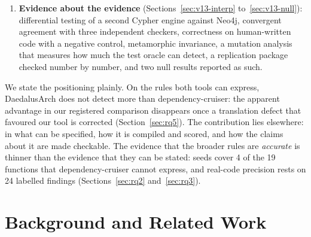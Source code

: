 \documentclass[10pt,a4paper]{article}
\newcommand{\tool}{DaedalusArch}
\newcommand{\dc}{dependency-cruiser}
\begin{document}
\begin{enumerate}
        fidelity reported as agreement with two other extractors, an independent correctness checker, an opt-in
        graph extension (APG v2) for facts no import graph holds, and eleven defects found and fixed with their
        effects attributed. All v1.3 figures are development-set figures; the hold-out run is pending.
  \item \textbf{Evidence about the evidence} (Sections~\ref{sec:v13-interp} to~\ref{sec:v13-null}): differential
        testing of a second Cypher engine against Neo4j, convergent agreement with three independent checkers,
        correctness on human-written code with a negative control, metamorphic invariance, a mutation analysis
        that measures how much the test oracle can detect, a replication package checked number by number, and
        two null results reported as such.
\end{enumerate}

We state the positioning plainly. On the rules both tools can express, \tool{} does not detect more than \dc{}:
the apparent advantage in our registered comparison disappears once a translation defect that favoured our tool is
corrected (Section~\ref{sec:rq5}). The contribution lies elsewhere: in what can be specified, how it is compiled and
scored, and how the claims about it are made checkable. The evidence that the broader rules are \emph{accurate} is
thinner than the evidence that they can be stated: seeds cover 4 of the 19 functions that \dc{} cannot express, and
real-code precision rests on 24 labelled findings (Sections~\ref{sec:rq2} and~\ref{sec:rq3}).

\section{Background and Related Work}\label{sec:related}
\end{document}
